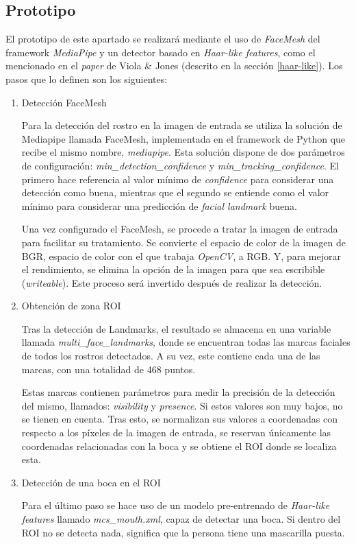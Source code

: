 \vspace{-0.8cm}
\subsection*{Prototipo}
\vspace{-0.5cm}
El prototipo de este apartado se realizará mediante el uso de \textit{FaceMesh} del framework \textit{MediaPipe} y un detector basado en \textit{Haar-like features}, como el mencionado en el \textit{paper} de Viola \& Jones (descrito en la sección \ref{haar-like}). Los pasos que lo definen son los siguientes:

\begin{enumerate}
	\item Detección FaceMesh
	
	Para la detección del rostro en la imagen de entrada se utiliza la solución de Mediapipe llamada FaceMesh, implementada en el framework de Python que recibe el mismo nombre, \textit{mediapipe}. Esta solución dispone de dos parámetros de configuración: \textit{min\_detection\_confidence} y \textit{min\_tracking\_confidence}. El primero hace referencia al valor mínimo de \textit{confidence} para considerar una detección como buena, mientras que el segundo se entiende como el valor mínimo para considerar una predicción de \textit{facial landmark} buena.
	
	Una vez configurado el FaceMesh, se procede a tratar la imagen de entrada para facilitar su tratamiento. Se convierte el espacio de color de la imagen de BGR, espacio de color con el que trabaja \textit{OpenCV}, a RGB. Y, para mejorar el rendimiento, se elimina la opción de la imagen para que sea escribible (\textit{writeable}). Este proceso será invertido después de realizar la detección.
	
	\item Obtención de zona ROI
	
	Tras la detección de Landmarks, el resultado se almacena en una variable llamada \textit{multi\_face\_landmarks}, donde se encuentran todas las marcas faciales de todos los rostros detectados. A su vez, este contiene cada una de las marcas, con una totalidad de 468 puntos.

	Estas marcas contienen parámetros para medir la precisión de la detección del mismo, llamados: \textit{visibility} y \textit{presence}. Si estos valores son muy bajos, no se tienen en cuenta. Tras esto, se normalizan sus valores a coordenadas con respecto a los píxeles de la imagen de entrada, se reservan únicamente las coordenadas relacionadas con la boca y se obtiene el ROI donde se localiza esta.
	
	\item Detección de una boca en el ROI 
	
	Para el último paso se hace uso de un modelo pre-entrenado de \textit{Haar-like features} llamado \textit{mcs\_mouth.xml}, capaz de detectar una boca. Si dentro del ROI no se detecta nada, significa que la persona tiene una mascarilla puesta.
\end{enumerate}


